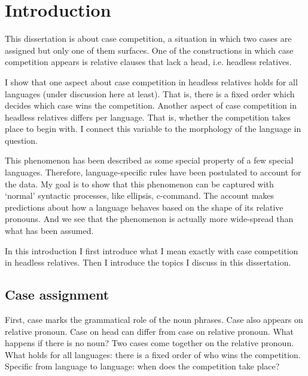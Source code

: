 
\chapter{Introduction}

This dissertation is about case competition, a situation in which two cases are assigned but only one of them surfaces. One of the constructions in which case competition appears is relative clauses that lack a head, i.e. headless relatives.

I show that one aspect about case competition in headless relatives holds for all languages (under discussion here at least). That is, there is a fixed order which decides which case wins the competition. Another aspect of case competition in headless relatives differs per language. That is, whether the competition takes place to begin with. I connect this variable to the morphology of the language in question.

This phenomenon has been described as some special property of a few special languages. Therefore, language-specific rules have been postulated to account for the data. My goal is to show that this phenomenon can be captured with `normal' syntactic processes, like ellipsis, c-command. The account makes predictions about how a language behaves based on the shape of its relative pronouns. And we see that the phenomenon is actually more wide-spread than what has been assumed.

In this introduction I first introduce what I mean exactly with case competition in headless relatives. Then I introduce the topics I discuss in this dissertation.


\section{Case assignment}

First, case marks the grammatical role of the noun phrases. Case also appears on relative pronoun. Case on head can differ from case on relative pronoun. What happens if there is no noun? Two cases come together on the relative pronoun. What holds for all languages: there is a fixed order of who wins the competition. Specific from language to language: when does the competition take place?


